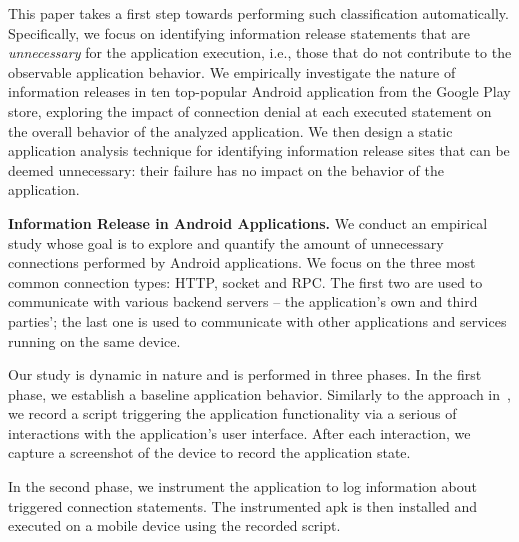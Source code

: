 This paper takes a first step towards performing such classification automatically. 
Specifically, we focus on identifying information release statements that are \emph{unnecessary} for  
the application execution, i.e., those that do not contribute to the observable application behavior.
We empirically investigate the nature of information releases in ten top-popular Android application from the Google Play store, exploring the impact of connection denial at each 
executed statement on the overall behavior of the analyzed application.
We then design a static application analysis technique for identifying information release sites that can be deemed unnecessary: their failure has no impact on the behavior of the application. 

\vspace{0.1in}
\noindent 
{\bf Information Release in Android Applications.}
We conduct an empirical study whose goal is to explore and quantify the amount of unnecessary connections performed by Android applications. 
We focus on the three most common connection types: HTTP, socket and RPC.
The first two are used to communicate with various backend servers -- the application's own and third parties'; 
the last one is used to communicate with other applications and services running on the same device.

Our study is dynamic in nature and is performed in three phases. 
In the first phase, we establish a baseline application behavior. 
Similarly to the approach in~\cite{Hornyack:Han:Jung:Schechter:Wetherall:CCS11}, we record a script triggering the application functionality via a serious of interactions with the application's user interface. 
After each interaction, we capture a screenshot of the device to record the application state. 

In the second phase, we instrument the application to log information about 
triggered connection statements. The instrumented apk is then installed and executed on a mobile device using the recorded script. 

